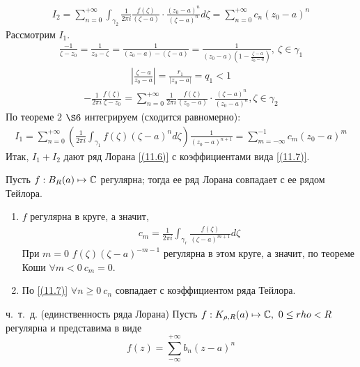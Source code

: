 \begin{enumerate}
    \begin{align*}
      I_2 = \sum_{n=0}^{+\infty}\int_{\gamma_2} \frac{1}{2 \pi i}\frac{f(\zeta)}{(\zeta - a)}\cdot \frac{(z_0-a)^n}{(\zeta - a)^n} d\zeta = \sum_{n=0}^{+\infty} c_n(z_0-a)^n
    \end{align*}
    Рассмотрим $I_1$.
    \begin{align*}
      \frac{-1}{\zeta - z_0} = \frac{1}{z_0-\zeta} = \frac{1}{(z_0 - a) - (\zeta-a)} = \frac{1}{(z_0 - a)\left( 1 - \frac{\zeta-a}{z_0-a} \right)}, \ \zeta \in \gamma_1
    \end{align*}
    \begin{align*}
      \left| \frac{\zeta-a}{z_0 - a} \right| = \frac{r_1}{\left| z_0-a \right|} = q_1 < 1
    \end{align*}
    \begin{align*}
      -\frac{1}{2 \pi i}\frac{f(\zeta)}{\zeta - z_0} = \sum_{n=0}^{+\infty}\frac{1}{2\pi i}\frac{f(\zeta)}{(z_0 - a)} \cdot \frac{(\zeta-a)^n}{(z_0 - a)^n}, \zeta \in \gamma_2
    \end{align*}
    По теореме $2$ $\S 6$ интегрируем (сходится равномерно):
    \begin{align*}
      I_1 = \sum_{n=0}^{+\infty}\left( \frac{1}{2\pi i}\int_{\gamma_1}f(\zeta)(\zeta - a)^n d\zeta \right) \frac{1}{(z_0-a)^{n+1}} = \sum_{m = -\infty}^{-1}c_m(z_0-a)^m
    \end{align*}
    Итак, $I_1+I_2$ дают ряд Лорана \eqref{(11.6)} с коэффициентами вида \eqref{(11.7)}.
\end{enumerate}
\corollary
Пусть $f: B_R(a) \mapsto \mathbb{C}$ регулярна; тогда ее ряд Лорана совпадает с ее
рядом Тейлора.
\pr
\begin{enumerate}
    \item $f$ регулярна в круге, а значит,
    \begin{align*}
      c_m = \frac{1}{2 \pi i}\int_{\gamma_r}\frac{f(\zeta)}{(\zeta - a)^{m+1}}d \zeta
    \end{align*}
    При $m = 0$ $f(\zeta)(\zeta - a)^{-m-1}$ регулярна в этом круге, а значит,
    по теореме Коши $\forall m < 0 \ c_m = 0$.
    \item По \eqref{(11.7)} $\forall n \geq  0 \ c_n$ совпадает с
    коэффициентом ряда Тейлора.
\end{enumerate}
ч.~т.~д.
\theorem (единственность ряда Лорана)
Пусть $f:K_{\rho,R}(a) \mapsto \mathbb{C}, \ 0 \leq rho < R$ регулярна и представима в
виде
\begin{equation}\label{(11.8)}
  f(z) = \sum_{-\infty}^{+\infty} b_n(z-a)^n
\end{equation}
